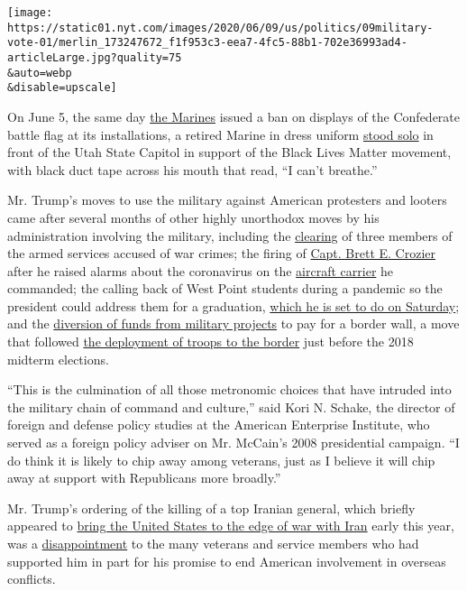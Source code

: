 \texttt{[image: https://static01.nyt.com/images/2020/06/09/us/politics/09military-vote-01/merlin\_173247672\_f1f953c3-eea7-4fc5-88b1-702e36993ad4-articleLarge.jpg?quality=75\\\&auto=webp\\\&disable=upscale]}

On June 5, the same day
\href{https://www.nytimes.com/2020/06/06/us/marines-confederate-flag-ban.html}{the
Marines} issued a ban on displays of the Confederate battle flag at its
installations, a retired Marine in dress uniform
\href{https://nypost.com/2020/06/07/utah-retired-marine-shows-support-for-black-lives-matter/}{stood
solo} in front of the Utah State Capitol in support of the Black Lives
Matter movement, with black duct tape across his mouth that read, ``I
can't breathe.''

Mr. Trump's moves to use the military against American protesters and
looters came after several months of other highly unorthodox moves by
his administration involving the military, including the
\href{https://www.nytimes.com/2019/11/15/us/trump-pardons.html}{clearing}
of three members of the armed services accused of war crimes; the firing
of
\href{https://www.nytimes.com/2020/05/05/us/politics/coronavirus-carrier-roosevelt.html}{Capt.
Brett E. Crozier} after he raised alarms about the coronavirus on the
\href{https://www.nytimes.com/2020/05/05/us/politics/coronavirus-carrier-roosevelt.html}{aircraft
carrier} he commanded; the calling back of West Point students during a
pandemic so the president could address them for a graduation,
\href{https://www.nytimes.com/2020/04/24/us/politics/coronavirus-trump-west-point.html}{which
he is set to do on Saturday}; and the
\href{https://www.nytimes.com/2019/09/03/us/politics/pentagon-border-wall.html}{diversion
of funds from military projects} to pay for a border wall, a move that
followed
\href{https://www.nytimes.com/2018/10/29/us/politics/border-security-troops-trump.html}{the
deployment of troops to the border} just before the 2018 midterm
elections.

``This is the culmination of all those metronomic choices that have
intruded into the military chain of command and culture,'' said Kori N.
Schake, the director of foreign and defense policy studies at the
American Enterprise Institute, who served as a foreign policy adviser on
Mr. McCain's 2008 presidential campaign. ``I do think it is likely to
chip away among veterans, just as I believe it will chip away at support
with Republicans more broadly.''

Mr. Trump's ordering of the killing of a top Iranian general, which
briefly appeared to
\href{https://www.nytimes.com/2020/01/08/world/middleeast/us-iran-war.html}{bring
the United States to the edge of war with Iran} early this year, was a
\href{https://www.nytimes.com/2020/01/09/us/politics/veterans-trump-iran.html}{disappointment}
to the many veterans and service members who had supported him in part
for his promise to end American involvement in overseas conflicts.

